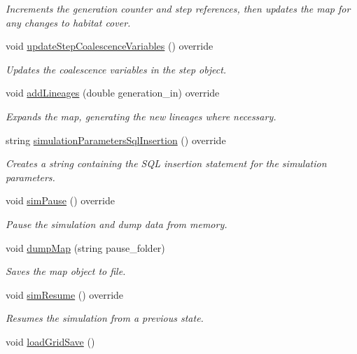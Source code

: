 \begin{DoxyCompactItemize}
\begin{DoxyCompactList}\small\item\em Increments the generation counter and step references, then updates the map for any changes to habitat cover. \end{DoxyCompactList}\item 
void \hyperlink{class_spatial_tree_ad14491fc87b0a9b28f5b8b316ee8a89d}{update\+Step\+Coalescence\+Variables} () override\hypertarget{class_spatial_tree_ad14491fc87b0a9b28f5b8b316ee8a89d}{}\label{class_spatial_tree_ad14491fc87b0a9b28f5b8b316ee8a89d}

\begin{DoxyCompactList}\small\item\em Updates the coalescence variables in the step object. \end{DoxyCompactList}\item 
void \hyperlink{class_spatial_tree_a6e802a5034648cc26b24923f27f85727}{add\+Lineages} (double generation\+\_\+in) override
\begin{DoxyCompactList}\small\item\em Expands the map, generating the new lineages where necessary. \end{DoxyCompactList}\item 
string \hyperlink{class_spatial_tree_acc54786661c182b6df23e57a61716e0f}{simulation\+Parameters\+Sql\+Insertion} () override
\begin{DoxyCompactList}\small\item\em Creates a string containing the S\+QL insertion statement for the simulation parameters. \end{DoxyCompactList}\item 
void \hyperlink{class_spatial_tree_af89289a1dc549102c0137763a7d26065}{sim\+Pause} () override\hypertarget{class_spatial_tree_af89289a1dc549102c0137763a7d26065}{}\label{class_spatial_tree_af89289a1dc549102c0137763a7d26065}

\begin{DoxyCompactList}\small\item\em Pause the simulation and dump data from memory. \end{DoxyCompactList}\item 
void \hyperlink{class_spatial_tree_a51b4c8703d179cc4a4c861f8b36b4a9b}{dump\+Map} (string pause\+\_\+folder)
\begin{DoxyCompactList}\small\item\em Saves the map object to file. \end{DoxyCompactList}\item 
void \hyperlink{class_spatial_tree_ad578ceeaf0ab3f4a2e39eb907881c11f}{sim\+Resume} () override
\begin{DoxyCompactList}\small\item\em Resumes the simulation from a previous state. \end{DoxyCompactList}\item 
void \hyperlink{class_spatial_tree_a6e3cfc1c0371d90ceaa7a463470de798}{load\+Grid\+Save} ()\hypertarget{class_spatial_tree_a6e3cfc1c0371d90ceaa7a463470de798}{}\label{class_spatial_tree_a6e3cfc1c0371d90ceaa7a463470de798}


\end{DoxyCompactItemize}
